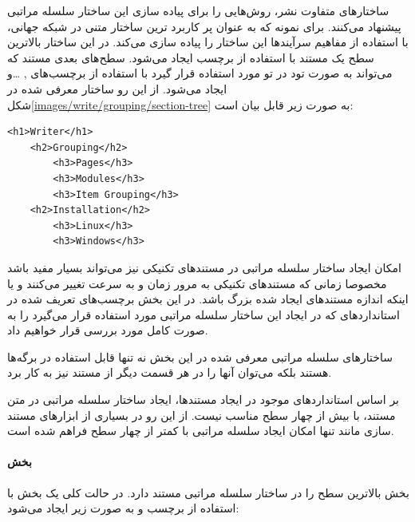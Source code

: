 ساختارهای متفاوت نشر، روش‌هایی را برای پیاده سازی این ساختار سلسله مراتبی
پیشنهاد می‌کنند. برای نمونه  که به عنوان پر کاربرد ترین ساختار متنی در
شبکه جهانی، با استفاده از مفاهیم سرآیندها این ساختار را پیاده سازی می‌کند. در
این ساختار بالاترین سطح یک مستند با استفاده از برچسب  ایجاد
می‌شود. سطح‌های بعدی مستند که می‌تواند به صورت تود در تو مورد استفاده قرار گیرد
با استفاده از برچسب‌های , \ldots و 
ایجاد می‌شود. از این رو ساختار معرفی شده در
شکل\ref{images/write/grouping/section-tree} به صورت زیر قابل بیان است:

\begin{latin}
\lstset{language=HTML}  
\begin{lstlisting}[frame=single] 
<h1>Writer</h1>
	<h2>Grouping</h2>
		<h3>Pages</h3>
		<h3>Modules</h3>
		<h3>Item Grouping</h3>
	<h2>Installation</h2>
		<h3>Linux</h3>
		<h3>Windows</h3>
\end{lstlisting}
\end{latin}

امکان ایجاد ساختار سلسله مراتبی در مستندهای تکنیکی نیز می‌تواند بسیار مفید باشد
مخصوصا زمانی که مستندهای تکنیکی به مرور زمان و به سرعت تغییر می‌کنند و یا اینکه
اندازه مستندهای ایجاد شده بزرگ باشد. در این بخش برچسب‌های تعریف شده در
استانداردهای  که در ایجاد این ساختار سلسله مراتبی مورد استفاده قرار
می‌گیرد را به صورت کامل مورد بررسی قرار خواهیم داد.

\begin{note}
ساختارهای سلسله مراتبی معرفی شده در این بخش نه تنها قابل استفاده در برگه‌ها
هستند بلکه می‌توان آنها را در هر قسمت دیگر از مستند نیز به کار برد.
\end{note}

\begin{info}
بر اساس استانداردهای موجود در ایجاد مستندها، ایجاد ساختار سلسله مراتبی در متن
مستند، با بیش از چهار سطح مناسب نیست.  از این رو در بسیاری از ابزارهای مستند
سازی مانند  تنها امکان ایجاد سلسله مراتبی با کمتر از چهار سطح فراهم
شده است.
\end{info}

\paragraph{بخش}

بخش بالاترین سطح را در ساختار سلسله مراتبی مستند دارد.
در حالت کلی یک بخش با استفاده از برچسب \lr{\\Section} و به صورت زیر ایجاد
می‌شود:


